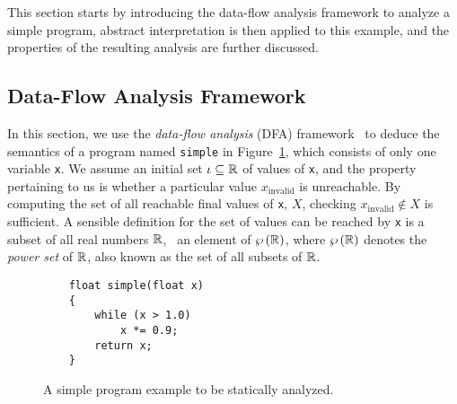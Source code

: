 This section starts by introducing the data-flow analysis framework to analyze
a simple program, abstract interpretation is then applied to this example, and
the properties of the resulting analysis are further discussed.


\subsection{Data-Flow Analysis Framework}
\label{bg:sub:data_flow}

In this section, we use the \emph{data-flow analysis} (DFA)
framework~\cite{nielson99} to deduce the semantics of a program named
\verb|simple| in Figure~\ref{bg:lst:simple}, which consists of only one
variable \verb|x|.  We assume an initial set $\iota \subseteq \mathbb{R}$ of
values of \verb|x|, and the property pertaining to us is whether a particular
value $x_\mathrm{invalid}$ is unreachable.  By computing the set of all
reachable final values of \verb|x|, $X$, checking $x_\mathrm{invalid} \notin
X$ is sufficient.  A sensible definition for the set of values can be reached
by \verb|x| is a subset of all real numbers $\mathbb{R}$, \ie~an element of
$\wp\left({\mathbb{R}}\right)$, where $\wp\left({\mathbb{R}}\right)$ denotes the \emph{power set}
of $\mathbb{R}$, also known as the set of all subsets of $\mathbb{R}$.
\begin{figure}[ht]
    \centering
    \begin{minipage}{0.5\textwidth}
    \begin{lstlisting}
    float simple(float x)
    {
        while (x > 1.0)
            x *= 0.9;
        return x;
    }
    \end{lstlisting}
    \end{minipage}
    \caption{%
        A simple program example to be statically analyzed.
    }\label{bg:lst:simple}
\end{figure}

